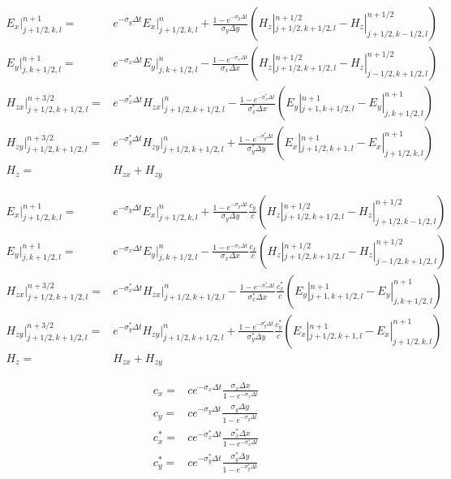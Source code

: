 %
\begin{subequations}
\begin{align}
E_x|^{n+1}_{j+1/2,k,l} = & e^{-\sigma_y\Delta t} E_x|^{n}_{j+1/2,k,l} + \frac{1-e^{-\sigma_y\Delta t}}{\sigma_y \Delta y} \left(H_z|^{n+1/2}_{j+1/2,k+1/2,l}-H_z|^{n+1/2}_{j+1/2,k-1/2,l}\right) \\
%
E_y|^{n+1}_{j,k+1/2,l} = & e^{-\sigma_x\Delta t} E_y|^{n}_{j,k+1/2,l} - \frac{1-e^{-\sigma_x\Delta t}}{\sigma_x \Delta x} \left(H_z|^{n+1/2}_{j+1/2,k+1/2,l}-H_z|^{n+1/2}_{j-1/2,k+1/2,l}\right) \\
%
H_{zx}|^{n+3/2}_{j+1/2,k+1/2,l} = & e^{-\sigma^*_x\Delta t} H_{zx}|^{n}_{j+1/2,k+1/2,l} - \frac{1-e^{-\sigma^*_x\Delta t}}{\sigma^*_x \Delta x} \left(E_y|^{n+1}_{j+1,k+1/2,l}-E_y|^{n+1}_{j,k+1/2,l}\right) \\
%
H_{zy}|^{n+3/2}_{j+1/2,k+1/2,l} = & e^{-\sigma^*_y\Delta t} H_{zy}|^{n}_{j+1/2,k+1/2,l} + \frac{1-e^{-\sigma^*_y\Delta t}}{\sigma^*_y \Delta y} \left(E_x|^{n+1}_{j+1/2,k+1,l}-E_x|^{n+1}_{j+1/2,k,l}\right) \\
%
H_z = & H_{zx}+H_{zy}
\end{align}
\end{subequations}


%
\begin{subequations}
\begin{align}
E_x|^{n+1}_{j+1/2,k,l} = & e^{-\sigma_y\Delta t} E_x|^{n}_{j+1/2,k,l} + \frac{1-e^{-\sigma_y\Delta t}}{\sigma_y \Delta y}\frac{c_y}{c} \left(H_z|^{n+1/2}_{j+1/2,k+1/2,l}-H_z|^{n+1/2}_{j+1/2,k-1/2,l}\right) \\
%
E_y|^{n+1}_{j,k+1/2,l} = & e^{-\sigma_x\Delta t} E_y|^{n}_{j,k+1/2,l} - \frac{1-e^{-\sigma_x\Delta t}}{\sigma_x \Delta x}\frac{c_x}{c} \left(H_z|^{n+1/2}_{j+1/2,k+1/2,l}-H_z|^{n+1/2}_{j-1/2,k+1/2,l}\right) \\
%
H_{zx}|^{n+3/2}_{j+1/2,k+1/2,l} = & e^{-\sigma^*_x\Delta t} H_{zx}|^{n}_{j+1/2,k+1/2,l} - \frac{1-e^{-\sigma^*_x\Delta t}}{\sigma^*_x \Delta x}\frac{c^*_x}{c} \left(E_y|^{n+1}_{j+1,k+1/2,l}-E_y|^{n+1}_{j,k+1/2,l}\right) \\
%
H_{zy}|^{n+3/2}_{j+1/2,k+1/2,l} = & e^{-\sigma^*_y\Delta t} H_{zy}|^{n}_{j+1/2,k+1/2,l} + \frac{1-e^{-\sigma^*_y\Delta t}}{\sigma^*_y \Delta y}\frac{c^*_y}{c} \left(E_x|^{n+1}_{j+1/2,k+1,l}-E_x|^{n+1}_{j+1/2,k,l}\right) \\
%
H_z = & H_{zx}+H_{zy}
\end{align}
\end{subequations}

\begin{subequations}
\begin{align}
c_x = & c e^{-\sigma_x\Delta t} \frac{\sigma_x \Delta x}{1-e^{-\sigma_x\Delta t}} \\
c_y = & c e^{-\sigma_y\Delta t} \frac{\sigma_y \Delta y}{1-e^{-\sigma_y\Delta t}} \\
c^*_x = & c e^{-\sigma^*_x\Delta t} \frac{\sigma^*_x \Delta x}{1-e^{-\sigma^*_x\Delta t}} \\
c^*_y = & c e^{-\sigma^*_y\Delta t} \frac{\sigma^*_y \Delta y}{1-e^{-\sigma^*_y\Delta t}}
\end{align}
\end{subequations}

